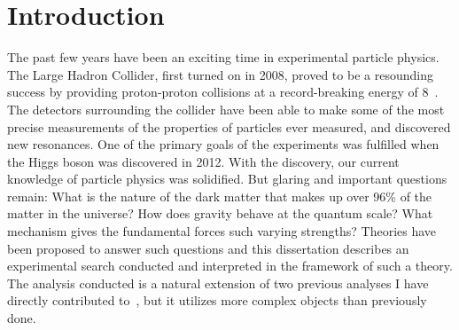 \clearpage
\section{Introduction\label{sec:intro}}

The past few years have been an exciting time in experimental
particle physics. The Large Hadron Collider, first turned on in 2008,
proved to be a resounding success by providing proton-proton collisions
at a record-breaking energy of 8~\TeV. The detectors surrounding the
collider have been able to make some of the most precise measurements
of the properties of particles ever measured, and discovered new resonances. 
One of the primary goals of the experiments was fulfilled when the Higgs 
boson was discovered in 2012. With the discovery, our current knowledge of particle physics was solidified.  
But glaring and important questions remain: What is the nature of the
dark matter that makes up over 96\% of the matter in the universe?
How does gravity behave at the quantum scale? What mechanism gives the
fundamental forces such varying strengths? Theories have been proposed
to answer such questions and this dissertation describes an experimental
search conducted and interpreted in the framework of such a theory.
The analysis conducted is a natural extension of two previous analyses I have directly
contributed to~\cite{RA1Paper2011FULL,RA1Paper2012ANHCP}, but it utilizes more 
complex objects than previously done.
